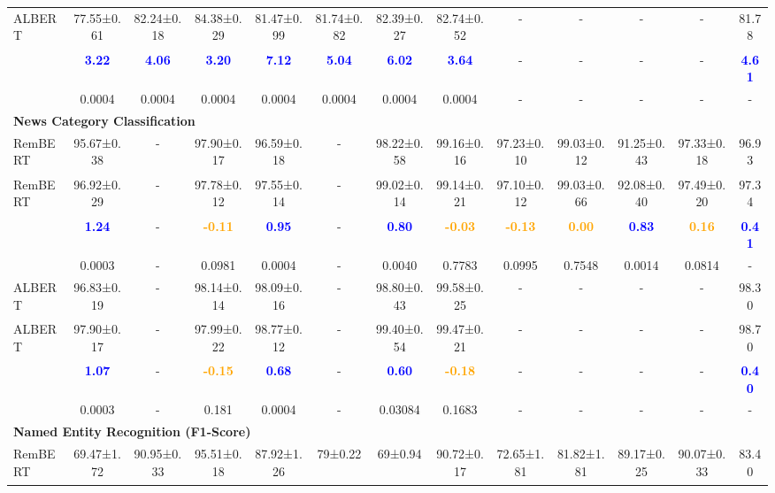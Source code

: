 \documentclass[11pt]{article}
\begin{document}
\begin{table*}[hbt!]
\begin{adjustbox}{max width=\textwidth}
\begin{tabular}{l c c c c c c c c c c c c}
ALBERT\textsubscript{}   & 77.55±0.61 & 82.24±0.18 & 84.38±0.29 & 81.47±0.99 & 81.74±0.82 & 82.39±0.27 & 82.74±0.52 & - &- & - & - & 81.78 \\
 & \textcolor{blue}{\textbf{3.22}} & \textcolor{blue}{\textbf{4.06}} & \textcolor{blue}{\textbf{3.20}} & \textcolor{blue}{\textbf{7.12}} & \textcolor{blue}{\textbf{5.04}} & \textcolor{blue}{\textbf{6.02}} & \textcolor{blue}{\textbf{3.64}} & - & - & - & - & \textcolor{blue}{\textbf{4.61}}\\
 &0.0004	&0.0004	&0.0004	&0.0004	&0.0004	&0.0004	&0.0004 &- &- & - & - & - \\
\midrule[2pt]
\multicolumn{13}{l}{\textbf{News Category Classification}}\\
RemBERT\textsubscript{}  & 95.67±0.38 & - & 97.90±0.17 & 96.59±0.18 & - & 98.22±0.58 & 99.16±0.16 & 97.23±0.10 & 99.03±0.12 & 91.25±0.43 & 97.33±0.18 & 96.93 \\
RemBERT\textsubscript{}  & 96.92±0.29 & - & 97.78±0.12 & 97.55±0.14 & - & 99.02±0.14 & 99.14±0.21 & 97.10±0.12 & 99.03±0.66 & 92.08±0.40 & 97.49±0.20 & 97.34 \\
 & \textcolor{blue}{\textbf{1.24}} & - & \textcolor{orange}{\textbf{-0.11}} & \textcolor{blue}{\textbf{0.95}} & - & \textcolor{blue}{\textbf{0.80}} & \textcolor{orange}{\textbf{-0.03}} &  \textcolor{orange}{\textbf{-0.13}} & \textcolor{orange}{\textbf{0.00}} & \textcolor{blue}{\textbf{0.83}} & \textcolor{orange}{\textbf{0.16}} & \textcolor{blue}{\textbf{0.41}}\\
 & 0.0003	& - & 0.0981 & 0.0004 & - & 0.0040 & 0.7783	& 0.0995 & 0.7548 & 0.0014 & 0.0814 & - \\
\midrule[1pt]
ALBERT\textsubscript{}            & 96.83±0.19 & - & 98.14±0.14 & 98.09±0.16 & - & 98.80±0.43 & 99.58±0.25 & - &- & - & - & 98.30\\
ALBERT\textsubscript{}   & 97.90±0.17 & - & 97.99±0.22 & 98.77±0.12 & - & 99.40±0.54 & 99.47±0.21 & - &- & - & - & 98.70\\
 & \textcolor{blue}{\textbf{1.07}} & - & \textcolor{orange}{\textbf{-0.15}} & \textcolor{blue}{\textbf{0.68}} & - & \textcolor{blue}{\textbf{0.60}} & \textcolor{orange}{\textbf{-0.18}} & - & - & - & - & \textcolor{blue}{\textbf{0.40}}\\
 &0.0003	&-	&0.181	&0.0004	&-	&0.03084 &0.1683 &- &- & - & - & -\\
\midrule[2pt]
\multicolumn{13}{l}{\textbf{\textbf{Named Entity Recognition (F1-Score)}}}\\
RemBERT\textsubscript{}  & 69.47±1.72 & 90.95±0.33 & 95.51±0.18 & 87.92±1.26 & 79±0.22 & 69±0.94 & 90.72±0.17 & 72.65±1.81 & 81.82±1.81 & 89.17±0.25 & 90.07±0.33 & 83.40\\

\end{tabular}
\end{adjustbox}
\end{table*}
\end{document}
